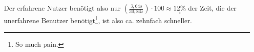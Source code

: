 \documentclass[a4paper,10pt]{article}
\newcommand{\dunderline}[1]{\underline{\underline{#1}}}
\begin{document}
\begin{itemize}
Der erfahrene Nutzer benötigt also nur $\left( \frac{3,64s}{30,84s} \right) \cdot 100 \approx \dunderline{12 \%}$ der Zeit, die der unerfahrene Benutzer benötigt\footnote{\glqq So much pain.\grqq}, ist also ca. zehnfach schneller.

\end{itemize}
\end{document}
